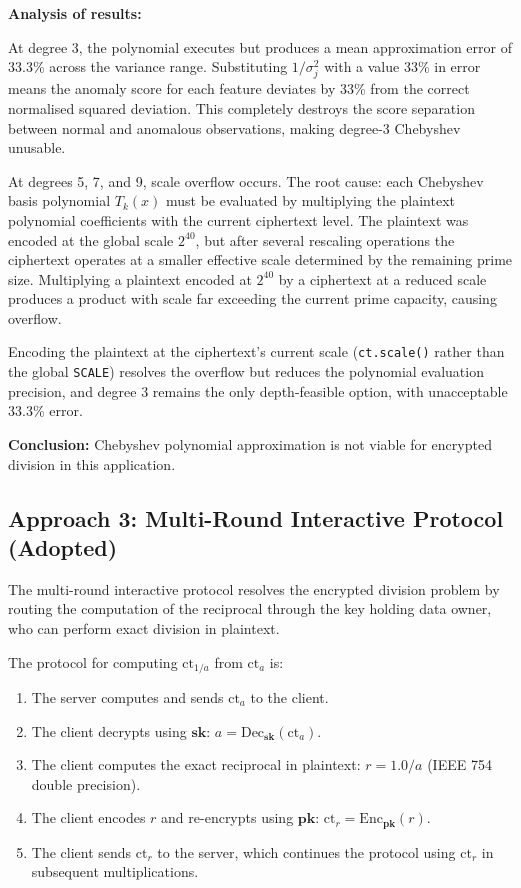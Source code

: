 \textbf{Analysis of results:}

At degree 3, the polynomial executes but produces a mean approximation error
of 33.3\% across the variance range. Substituting $1/\sigma_j^2$ with a value
33\% in error means the anomaly score for each feature deviates by 33\% from
the correct normalised squared deviation. This completely destroys the score
separation between normal and anomalous observations, making degree-3 Chebyshev
unusable.

At degrees 5, 7, and 9, scale overflow occurs. The root cause: each Chebyshev
basis polynomial $T_k(x)$ must be evaluated by multiplying the plaintext
polynomial coefficients with the current ciphertext level. The plaintext was
encoded at the global scale $2^{40}$, but after several rescaling operations
the ciphertext operates at a smaller effective scale determined by the remaining
prime size. Multiplying a plaintext encoded at $2^{40}$ by a ciphertext at a
reduced scale produces a product with scale far exceeding the current prime
capacity, causing overflow.

Encoding the plaintext at the ciphertext's current scale (\texttt{ct.scale()}
rather than the global \texttt{SCALE}) resolves the overflow but reduces the
polynomial evaluation precision, and degree 3 remains the only depth-feasible
option, with unacceptable 33.3\% error.

\textbf{Conclusion:} Chebyshev polynomial approximation is not viable for
encrypted division in this application.

\subsection{Approach 3: Multi-Round Interactive Protocol (Adopted)}

The multi-round interactive protocol resolves the encrypted division problem
by routing the computation of the reciprocal through the key holding data owner,
who can perform exact division in plaintext.

The protocol for computing $\mathrm{ct}_{1/a}$ from $\mathrm{ct}_a$ is:

\begin{enumerate}
  \item The server computes and sends $\mathrm{ct}_a$ to the client.
  \item The client decrypts using $\mathbf{sk}$: $a = \mathrm{Dec}_\mathbf{sk}
  (\mathrm{ct}_a)$.
  \item The client computes the exact reciprocal in plaintext:
  $r = 1.0 / a$ (IEEE 754 double precision).
  \item The client encodes $r$ and re-encrypts using $\mathbf{pk}$:
  $\mathrm{ct}_r = \mathrm{Enc}_\mathbf{pk}(r)$.
  \item The client sends $\mathrm{ct}_r$ to the server, which continues the
  protocol using $\mathrm{ct}_r$ in subsequent multiplications.
\end{enumerate}

